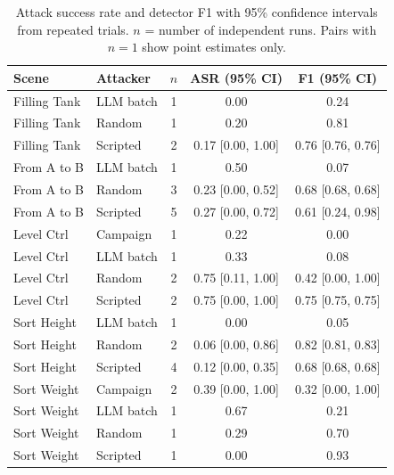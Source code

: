 %
%
\begin{table}[t]
\centering
\caption{Attack success rate and detector F1 with 95\% confidence intervals from repeated trials. $n$ = number of independent runs. Pairs with $n=1$ show point estimates only.}
\label{tab:variance}
\small
\begin{tabular}{llccc}
\toprule
\textbf{Scene} & \textbf{Attacker} & $n$ & \textbf{ASR (95\% CI)} & \textbf{F1 (95\% CI)} \\
\midrule
Filling Tank & LLM batch & 1 & 0.00 & 0.24 \\
Filling Tank & Random & 1 & 0.20 & 0.81 \\
Filling Tank & Scripted & 2 & 0.17 [0.00, 1.00] & 0.76 [0.76, 0.76] \\
From A to B & LLM batch & 1 & 0.50 & 0.07 \\
From A to B & Random & 3 & 0.23 [0.00, 0.52] & 0.68 [0.68, 0.68] \\
From A to B & Scripted & 5 & 0.27 [0.00, 0.72] & 0.61 [0.24, 0.98] \\
Level Ctrl & Campaign & 1 & 0.22 & 0.00 \\
Level Ctrl & LLM batch & 1 & 0.33 & 0.08 \\
Level Ctrl & Random & 2 & 0.75 [0.11, 1.00] & 0.42 [0.00, 1.00] \\
Level Ctrl & Scripted & 2 & 0.75 [0.00, 1.00] & 0.75 [0.75, 0.75] \\
Sort Height & LLM batch & 1 & 0.00 & 0.05 \\
Sort Height & Random & 2 & 0.06 [0.00, 0.86] & 0.82 [0.81, 0.83] \\
Sort Height & Scripted & 4 & 0.12 [0.00, 0.35] & 0.68 [0.68, 0.68] \\
Sort Weight & Campaign & 2 & 0.39 [0.00, 1.00] & 0.32 [0.00, 1.00] \\
Sort Weight & LLM batch & 1 & 0.67 & 0.21 \\
Sort Weight & Random & 1 & 0.29 & 0.70 \\
Sort Weight & Scripted & 1 & 0.00 & 0.93 \\
\bottomrule
\end{tabular}
\end{table}
